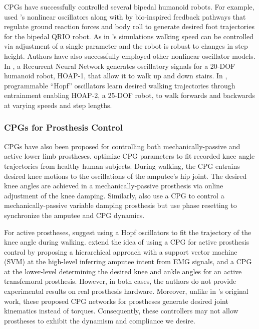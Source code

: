 CPGs have successfully controlled several bipedal humanoid robots. For example,
\citet{endo2005experimental} used \citeauthor{matsuoka1987mechanisms}'s
nonlinear oscillators along with by bio-inspired feedback pathways that regulate
ground reaction forces and body roll to generate desired foot trajectories for
the bipedal QRIO robot. As in \citeauthor{taga1991self}'s simulations walking
speed can be controlled via adjustment of a single parameter and the robot is
robust to changes in step height. Authors have also successfully employed other
nonlinear oscillator models. In \citet{shan2002neural}, a Recurrent Neural
Network generates oscillatory signals for a 20-DOF humanoid robot, HOAP-1, that
allow it to walk up and down stairs. In \citet{righetti2006programmable},
programmable ``Hopf'' oscillators \citep{righetti2006dynamic} learn desired
walking trajectories through entrainment enabling HOAP-2, a 25-DOF robot, to
walk forwards and backwards at varying speeds and step lengths.  

\subsubsection{CPGs for Prosthesis Control}
CPGs have also been proposed for controlling both mechanically-passive and
active lower limb prostheses.  \citet{nandi2009development} optimize CPG
parameters to fit recorded knee angle trajectories from healthy human subjects.
During walking, the CPG entrains desired knee motions to the oscillations of the
amputee's hip joint. The desired knee angles are achieved in a
mechanically-passive prosthesis via online adjustment of the knee damping.
Similarly, \citet{torrealba2010through, mora2012cybernetic} also use a CPG to
control a mechanically-passive variable damping prosthesis but use phase
resetting to synchronize the amputee and CPG dynamics. 

For active prostheses, \citet{geng2012design} suggest using a Hopf oscillators
to fit the trajectory of the knee angle during walking. \citet{guo2010study}
extend the idea of using a CPG for active prosthesis control by proposing a
hierarchical approach with a support vector machine (SVM) at the high-level
inferring amputee intent from EMG signals, and a CPG at the lower-level
determining the desired knee and ankle angles for an active transfemoral
prosthesis. However, in both cases, the authors do not provide experimental
results on real prosthesis hardware. Moreover, unlike in
\citeauthor{taga1991self}'s original work, these proposed CPG networks for
prostheses generate desired joint kinematics instead of torques. Consequently,
these controllers may not allow prostheses to exhibit the dynamism and
compliance we desire.


